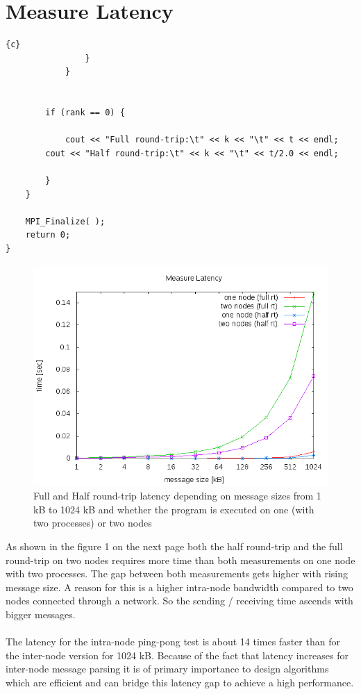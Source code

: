 \documentclass{article}
\newcommand{\enterProblemHeader}[1]{
}
\newcommand{\exitProblemHeader}[1]{
}
\newcounter{homeworkProblemCounter} %
\newcommand{\homeworkProblemName}{}
\newenvironment{homeworkProblem}[1][Problem \arabic{homeworkProblemCounter}]{ %
\stepcounter{homeworkProblemCounter} %
\renewcommand{\homeworkProblemName}{#1} %
\section{\homeworkProblemName} %
}{
}
\begin{document}
\begin{homeworkProblem}[Measure Latency]
\begin{lstlisting}{c}
                }
            }


        if (rank == 0) {

            cout << "Full round-trip:\t" << k << "\t" << t << endl;
	    cout << "Half round-trip:\t" << k << "\t" << t/2.0 << endl;
	    
        }
    }

    MPI_Finalize( );
    return 0;
}
\end{lstlisting}
\begin{figure}   
        \includegraphics[scale=1.0]{measure_latency.png}
    \caption{Full and Half round-trip latency depending on message sizes from 1 kB to 1024 kB and whether the program is executed on one (with two processes) or two nodes}
\end{figure} 
As shown in the figure 1 on the next page both the half round-trip and the full round-trip on two nodes requires more time than both measurements on one node with two processes. The gap between both measurements gets higher with rising message size. A reason for this is a higher intra-node bandwidth compared to two nodes connected through a network. So the sending / receiving time ascends with bigger messages. \\ \\
The latency for the intra-node ping-pong test is about 14 times faster than for the inter-node version for 1024 kB. 
Because of the fact that latency increases for inter-node message parsing it is of primary importance to design algorithms which are efficient and can bridge this latency gap to achieve a high performance.
\end{homeworkProblem}
\end{document}
